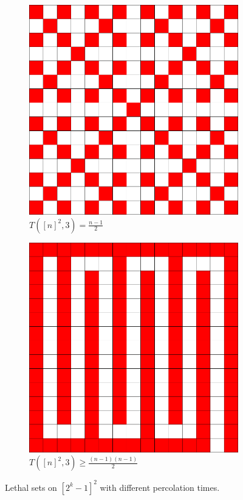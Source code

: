 \begin{figure}[]
\centering
\hspace*{\fill}
\begin{subfigure}{0.3\textwidth}
	\includegraphics[width=\textwidth]{figures/1/15x15x1.pdf}
	\caption{$T([n]^2,3) = \frac{n-1}{2}$}
	\label{fig:fast}
\end{subfigure} \hfill%
\begin{subfigure}{0.3\textwidth}
	\includegraphics[width=\textwidth]{figures/1/15x15x1_slow.pdf}
	\caption{$T([n]^2,3) \geq \frac{(n-1)(n-1)}{2}$}
	\label{fig:slow}
\end{subfigure}
\hspace*{\fill}
\caption{Lethal sets on $[2^k-1]^2$ with different percolation times.}
\label{fig:percolation_time}
\end{figure} 

